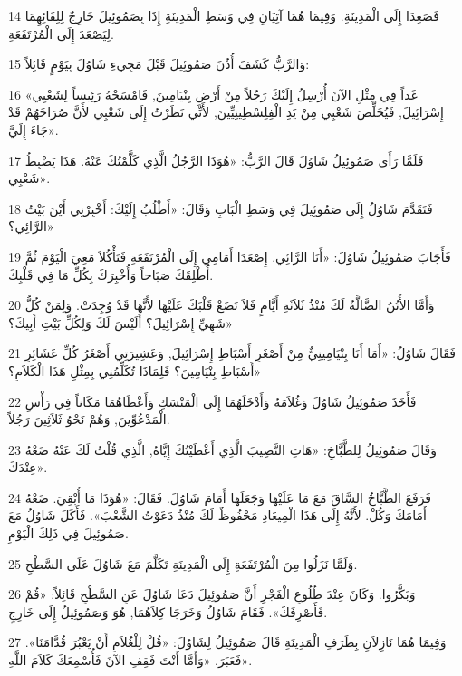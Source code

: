 \par 14 فَصَعِدَا إِلَى الْمَدِينَةِ. وَفِيمَا هُمَا آتِيَانِ فِي وَسَطِ الْمَدِينَةِ إِذَا بِصَمُوئِيلَ خَارِجٌ لِلِقَائِهِمَا لِيَصْعَدَ إِلَى الْمُرْتَفَعَةِ.
\par 15 وَالرَّبُّ كَشَفَ أُذُنَ صَمُوئِيلَ قَبْلَ مَجِيءِ شَاوُلَ بِيَوْمٍ قَائِلاً:
\par 16 «غَداً فِي مِثْلِ الآنَ أُرْسِلُ إِلَيْكَ رَجُلاً مِنْ أَرْضِ بِنْيَامِينَ, فَامْسَحْهُ رَئِيساً لِشَعْبِي إِسْرَائِيلَ, فَيُخَلِّصَ شَعْبِي مِنْ يَدِ الْفِلِسْطِينِيِّينَ, لأَنِّي نَظَرْتُ إِلَى شَعْبِي لأَنَّ صُرَاخَهُمْ قَدْ جَاءَ إِلَيَّ».
\par 17 فَلَمَّا رَأَى صَمُوئِيلُ شَاوُلَ قَالَ الرَّبُّ: «هُوَذَا الرَّجُلُ الَّذِي كَلَّمْتُكَ عَنْهُ. هَذَا يَضْبِطُ شَعْبِي».
\par 18 فَتَقَدَّمَ شَاوُلُ إِلَى صَمُوئِيلَ فِي وَسَطِ الْبَابِ وَقَالَ: «أَطْلُبُ إِلَيْكَ: أَخْبِرْنِي أَيْنَ بَيْتُ الرَّائِي؟»
\par 19 فَأَجَابَ صَمُوئِيلُ شَاوُلَ: «أَنَا الرَّائِي. إِصْعَدَا أَمَامِي إِلَى الْمُرْتَفَعَةِ فَتَأْكُلاَ مَعِيَ الْيَوْمَ ثُمَّ أُطْلِقَكَ صَبَاحاً وَأُخْبِرَكَ بِكُلِّ مَا فِي قَلْبِكَ.
\par 20 وَأَمَّا الأُتُنُ الضَّالَّةُ لَكَ مُنْذُ ثَلاَثَةِ أَيَّامٍ فَلاَ تَضَعْ قَلْبَكَ عَلَيْهَا لأَنَّهَا قَدْ وُجِدَتْ. وَلِمَنْ كُلُّ شَهِيِّ إِسْرَائِيلَ؟ أَلَيْسَ لَكَ وَلِكُلِّ بَيْتِ أَبِيكَ؟»
\par 21 فَقَالَ شَاوُلُ: «أَمَا أَنَا بِنْيَامِينِيٌّ مِنْ أَصْغَرِ أَسْبَاطِ إِسْرَائِيلَ, وَعَشِيرَتِي أَصْغَرُ كُلِّ عَشَائِرِ أَسْبَاطِ بِنْيَامِينَ؟ فَلِمَاذَا تُكَلِّمُنِي بِمِثْلِ هَذَا الْكَلاَمِ؟»
\par 22 فَأَخَذَ صَمُوئِيلُ شَاوُلَ وَغُلاَمَهُ وَأَدْخَلَهُمَا إِلَى الْمَنْسَكِ وَأَعْطَاهُمَا مَكَاناً فِي رَأْسِ الْمَدْعُوِّينَ, وَهُمْ نَحْوُ ثَلاَثِينَ رَجُلاً.
\par 23 وَقَالَ صَمُوئِيلُ لِلطَّبَّاخِ: «هَاتِ النَّصِيبَ الَّذِي أَعْطَيْتُكَ إِيَّاهُ, الَّذِي قُلْتُ لَكَ عَنْهُ ضَعْهُ عِنْدَكَ».
\par 24 فَرَفَعَ الطَّبَّاخُ السَّاقَ مَعَ مَا عَلَيْهَا وَجَعَلَهَا أَمَامَ شَاوُلَ. فَقَالَ: «هُوَذَا مَا أُبْقِيَ. ضَعْهُ أَمَامَكَ وَكُلْ. لأَنَّهُ إِلَى هَذَا الْمِيعَادِ مَحْفُوظٌ لَكَ مُنْذُ دَعَوْتُ الشَّعْبَ». فَأَكَلَ شَاوُلُ مَعَ صَمُوئِيلَ فِي ذَلِكَ الْيَوْمِ.
\par 25 وَلَمَّا نَزَلُوا مِنَ الْمُرْتَفَعَةِ إِلَى الْمَدِينَةِ تَكَلَّمَ مَعَ شَاوُلَ عَلَى السَّطْحِ.
\par 26 وَبَكَّرُوا. وَكَانَ عِنْدَ طُلُوعِ الْفَجْرِ أَنَّ صَمُوئِيلَ دَعَا شَاوُلَ عَنِ السَّطْحِ قَائِلاً: «قُمْ فَأَصْرِفَكَ». فَقَامَ شَاوُلُ وَخَرَجَا كِلاَهُمَا, هُوَ وَصَمُوئِيلُ إِلَى خَارِجٍ.
\par 27 وَفِيمَا هُمَا نَازِلاَنِ بِطَرَفِ الْمَدِينَةِ قَالَ صَمُوئِيلُ لِشَاوُلَ: «قُلْ لِلْغُلاَمِ أَنْ يَعْبُرَ قُدَّامَنَا». فَعَبَرَ. «وَأَمَّا أَنْتَ فَقِفِ الآنَ فَأُسْمِعَكَ كَلاَمَ اللَّهِ».

